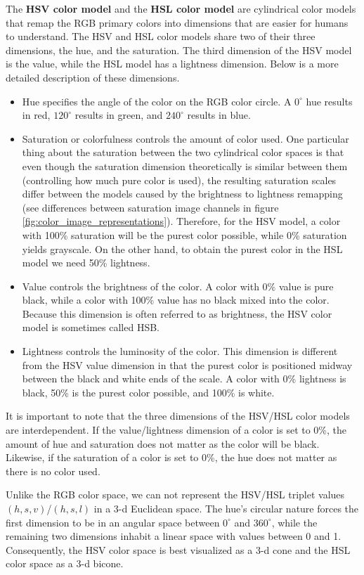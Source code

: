 The \textbf{HSV color model} and the \textbf{HSL color model} are cylindrical color models that remap the RGB primary colors into dimensions that are easier for humans to understand. The HSV and HSL color models share two of their three dimensions, the hue, and the saturation. The third dimension of the HSV model is the value, while the HSL model has a lightness dimension. Below is a more detailed description of these dimensions.

\begin{itemize}
	\item Hue specifies the angle of the color on the RGB color circle. A $0^\circ$ hue results in red, $120^\circ$ results in green, and $240^\circ$ results in blue.
	\item Saturation or colorfulness controls the amount of color used. One particular thing about the saturation between the two cylindrical color spaces is that even though the saturation dimension theoretically is similar between them (controlling how much pure color is used), the resulting saturation scales differ between the models caused by the brightness to lightness remapping (see differences between saturation image channels in figure \ref{fig:color_image_representations}). Therefore, for the HSV model, a color with 100\% saturation will be the purest color possible, while 0\% saturation yields grayscale. On the other hand, to obtain the purest color in the HSL model we need 50\% lightness.
	\item Value controls the brightness of the color. A color with 0\% value is pure black, while a color with 100\% value has no black mixed into the color. Because this dimension is often referred to as brightness, the HSV color model is sometimes called HSB.
	\item Lightness controls the luminosity of the color. This dimension is different from the HSV value dimension in that the purest color is positioned midway between the black and white ends of the scale. A color with 0\% lightness is black, 50\% is the purest color possible, and 100\% is white.
\end{itemize}

It is important to note that the three dimensions of the HSV/HSL color models are interdependent. If the value/lightness dimension of a color is set to 0\%, the amount of hue and saturation does not matter as the color will be black. Likewise, if the saturation of a color is set to 0\%, the hue does not matter as there is no color used.

Unlike the RGB color space, we can not represent the HSV/HSL triplet values $(h,s,v)$/$(h,s,l)$ in a 3-d Euclidean space. The hue's circular nature forces the first dimension to be in an angular space between $0^\circ$ and $360^\circ$, while the remaining two dimensions inhabit a linear space with values between 0 and 1. Consequently, the HSV color space is best visualized as a 3-d cone and the HSL color space as a 3-d bicone.

